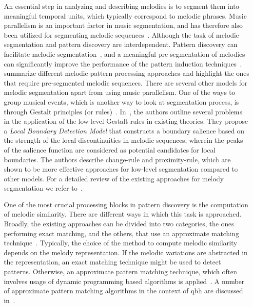 An essential step in analyzing and describing melodies is to segment them into meaningful temporal units, which typically correspond to melodic phrases. Music parallelism is an important factor in music segmentation, and has therefore also been utilized for segmenting melodic sequences~\citep{Cambouropoulos2006}. Although the task of melodic segmentation and pattern discovery are interdependent. Pattern discovery can facilitate melodic segmentation~\citep{Cambouropoulos2006}, and a meaningful pre-segmentation of melodies can significantly improve the performance of the pattern induction techniques~\citep{hiraga1997structural}. \cite{cambouropoulos2001pattern} summarize different melodic pattern processing approaches and highlight the ones that require pre-segmented melodic sequences. There are several other models for melodic segmentation apart from using music parallelism. One of the ways to group musical events, which is another way to look at segmentation process, is through Gestalt principles (or rules)~\citep{Lerdahl1983,tenney1980temporal}. In~\cite{cambouropoulos1996formal,cambouropoulos2001local}, the authors outline several problems in the application of the low-level Gestalt rules in existing theories. They propose a \textit{Local Boundary Detection Model} that constructs a boundary salience based on the strength of the local discontinuities in melodic sequences, wherein the peaks of the salience function are considered as potential candidates for local boundaries. The authors describe change-rule and proximity-rule, which are shown to be more effective approaches for low-level segmentation compared to other models. For a detailed review of the existing approaches for melody segmentation we refer to~\cite{cambouropoulos2001pattern}.

One of the most crucial processing blocks in pattern discovery is the computation of melodic similarity. There are different ways in which this task is approached. Broadly, the existing approaches can be divided into two categories, the ones performing exact matching, and the others, that use an approximate matching technique~\citep{cambouropoulos2001pattern}. Typically, the choice of the method to compute melodic similarity depends on the melody representation. If the melodic variations are abstracted in the representation, an exact matching technique might be used to detect patterns. Otherwise, an approximate pattern matching technique, which often involves usage of dynamic programming based algorithms is applied~\citep{rolland1999discovering}. A number of approximate pattern matching algorithms in the context of \gls{qbh} are discussed in~. 

